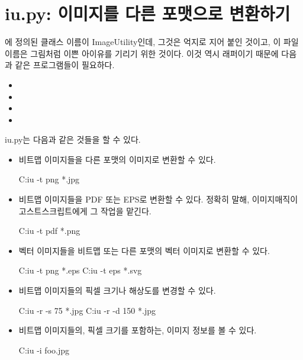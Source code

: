 \section{iu.py: 이미지를 다른 포맷으로 변환하기}

에 정의된 클래스 이름이 ImageUtility인데, 그것은 억지로 지어 붙인 것이고, 이 파일 이름은 그림처럼 이쁜 아이유를 기리기 위한 것이다.
이것 역시 래퍼이기 때문에 다음과 같은 프로그램들이 필요하다.

\begin{itemize}*
\item {}
\item {}
\item {}
\item {}
\end{itemize}

iu.py는 다음과 같은 것들을 할 수 있다.

\begin{itemize}

\item 비트맵 이미지들을 다른 포맷의 이미지로 변환할 수 있다.

\begin{code}
C:\>iu -t png *.jpg
\end{code}

\item 비트맵 이미지들을 PDF 또는 EPS로 변환할 수 있다.
정확히 말해, 이미지매직이 고스트스크립트에게 그 작업을 맡긴다.

\begin{code}
C:\>iu -t pdf *.png
\end{code}

\item 벡터 이미지들을 비트맵 또는 다른 포맷의 벡터 이미지로 변환할 수 있다.

\begin{code}
C:\>iu -t png *.eps
C:\>iu -t eps *.svg
\end{code}

\item 비트맵 이미지들의 픽셀 크기나 해상도를 변경할 수 있다.

\begin{code}
C:\>iu -r -s 75 *.jpg
C:\>iu -r -d 150 *.jpg
\end{code}

\item 비트맵 이미지들의, 픽셀 크기를 포함하는, 이미지 정보를 볼 수 있다.

\begin{code}
C:\>iu -i foo.jpg
\end{code}
\end{itemize}

